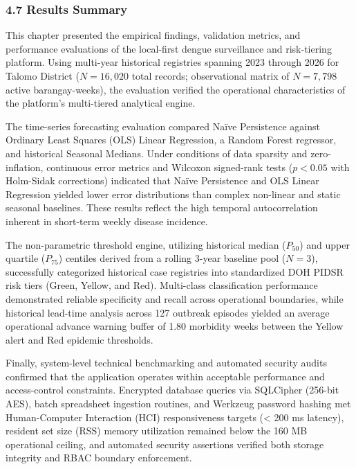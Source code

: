 \documentclass[
]{article}
\begin{document}
\subsubsection{\texorpdfstring{\textbf{4.7 Results
Summary}}{4.7 Results Summary}}\label{results-summary}

This chapter presented the empirical findings, validation metrics, and
performance evaluations of the local-first dengue surveillance and
risk-tiering platform. Using multi-year historical registries spanning
2023 through 2026 for Talomo District (\(N = 16,020\) total records;
observational matrix of \(N = 7,798\) active barangay-weeks), the
evaluation verified the operational characteristics of the platform's
multi-tiered analytical engine.

The time-series forecasting evaluation compared Naïve Persistence
against Ordinary Least Squares (OLS) Linear Regression, a Random Forest
regressor, and historical Seasonal Medians. Under conditions of data
sparsity and zero-inflation, continuous error metrics and Wilcoxon
signed-rank tests (\(p < 0.05\) with Holm-Sidak corrections) indicated
that Naïve Persistence and OLS Linear Regression yielded lower error
distributions than complex non-linear and static seasonal baselines.
These results reflect the high temporal autocorrelation inherent in
short-term weekly disease incidence.

The non-parametric threshold engine, utilizing historical median
(\(P_{50}\)) and upper quartile (\(P_{75}\)) centiles derived from a
rolling 3-year baseline pool (\(N = 3\)), successfully categorized
historical case registries into standardized DOH PIDSR risk tiers
(Green, Yellow, and Red). Multi-class classification performance
demonstrated reliable specificity and recall across operational
boundaries, while historical lead-time analysis across 127 outbreak
episodes yielded an average operational advance warning buffer of 1.80
morbidity weeks between the Yellow alert and Red epidemic thresholds.

Finally, system-level technical benchmarking and automated security
audits confirmed that the application operates within acceptable
performance and access-control constraints. Encrypted database queries
via SQLCipher (256-bit AES), batch spreadsheet ingestion routines, and
Werkzeug password hashing met Human-Computer Interaction (HCI)
responsiveness targets (\textless{} 200 ms latency), resident set size
(RSS) memory utilization remained below the 160 MB operational ceiling,
and automated security assertions verified both storage integrity and
RBAC boundary enforcement.
\end{document}

